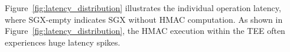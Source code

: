 Figure~\ref{fig:latency_distribution} illustrates the individual operation latency, where SGX-empty indicates SGX without HMAC computation. 
As shown in Figure~\ref{fig:latency_distribution}, the HMAC execution within the TEE often experiences huge latency spikes. 




